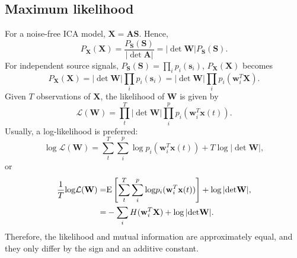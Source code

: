 \subsection{Maximum likelihood\label{Sec:DR:ICA:ML}}
For a noise-free ICA model, $\mathbf{X}=\mathbf{AS}$. Hence,
\begin{equation}
	P_\mathbf{X}(\mathbf{X})=\frac{P_\mathbf{S}(\mathbf{S})}{|{\operatorname{det}}\mathbf{A}|}=|{\operatorname{det}}\mathbf{W}|P_\mathbf{S}(\mathbf{S}).
\end{equation}
For independent source signals, $P_\mathbf{S}(\mathbf{S})=\prod_ip_i(\mathbf{s}_i)$, $P_\mathbf{X}(\mathbf{X})$ becomes
\begin{equation}
	P_\mathbf{X}(\mathbf{X})=|{\operatorname{det}}\mathbf{W}|\prod_ip_i(\mathbf{s}_i)=|{\operatorname{det}}\mathbf{W}|\prod_ip_i(\mathbf{w}_i^T\mathbf{X}).
\end{equation}
Given $T$ observations of $\mathbf{X}$, the likelihood of $\mathbf{W}$ is given by
\begin{equation}
	\mathcal{L}(\mathbf{W})=\prod_t^T|{\operatorname{det}}\mathbf{W}|\prod_i^p p_i(\mathbf{w}_i^T\mathbf{x}(t)).
\end{equation}
Usually, a log-likelihood is preferred:
\begin{equation}
	{\operatorname{log}}\mathcal{L}(\mathbf{W})=\sum_t^T\sum_i^p{\operatorname{log}}p_i(\mathbf{w}_i^T\mathbf{x}(t))+T\operatorname{log}|{\operatorname{det}}\mathbf{W}|,
\end{equation}
or
\begin{align}
	\frac{1}{T}{\operatorname{log}}\mathcal{L}(\mathbf{W})=&{\operatorname{E}}\left[\sum_t^T\sum_i^p{\operatorname{log}}p_i(\mathbf{w}_i^T\mathbf{x}(t))\right]+\operatorname{log}|{\operatorname{det}}\mathbf{W}|,\notag\\
	=&-\sum_i H(\mathbf{w}_i^T\mathbf{X})+\operatorname{log}|{\operatorname{det}}\mathbf{W}|.
\end{align}
Therefore, the likelihood and mutual information are approximately equal, and they only differ by the sign and an additive constant.